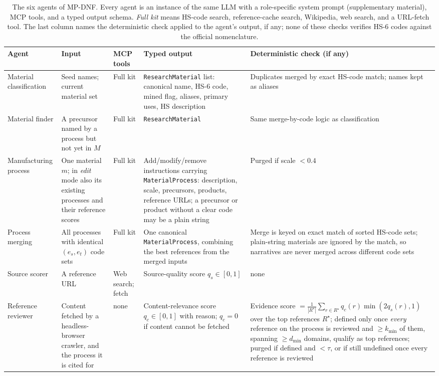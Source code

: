 \begin{table}[t]
\centering\footnotesize
\caption{The six agents of MP-DNF. Every agent is an instance of the same LLM with a role-specific system prompt (supplementary material), MCP tools, and a typed output schema. \emph{Full kit} means HS-code search, reference-cache search, Wikipedia, web search, and a URL-fetch tool. The last column names the deterministic check applied to the agent's output, if any; none of these checks verifies HS-6 codes against the official nomenclature.}
\label{tab:agents}
\begin{tabular}{>{\raggedright\arraybackslash}p{2.6cm}>{\raggedright\arraybackslash}p{3.6cm}>{\raggedright\arraybackslash}p{2.2cm}>{\raggedright\arraybackslash}p{3.8cm}>{\raggedright\arraybackslash}p{3.8cm}}
\toprule
Agent & Input & MCP tools & Typed output & Deterministic check (if any) \\
\midrule
Material classification & Seed names; current material set & Full kit & \texttt{ResearchMaterial} list: canonical name, HS-6 code, mined flag, aliases, primary uses, HS description & Duplicates merged by exact HS-code match; names kept as aliases \\
Material finder & A precursor named by a process but not yet in $M$ & Full kit & \texttt{ResearchMaterial} & Same merge-by-code logic as classification \\
Manufacturing process & One material $m$; in \emph{edit} mode also its existing processes and their reference scores & Full kit & Add/modify/remove instructions carrying \texttt{MaterialProcess}: description, scale, precursors, products, reference URLs; a precursor or product without a clear code may be a plain string & Purged if scale $<0.4$ \\
Process merging & All processes with identical $(e_s,e_t)$ code sets & Full kit & One canonical \texttt{MaterialProcess}, combining the best references from the merged inputs & Merge is keyed on exact match of sorted HS-code sets; plain-string materials are ignored by the match, so narratives are never merged across different code sets \\
Source scorer & A reference URL & Web search; fetch & Source-quality score $q_s\in[0,1]$ & none \\
Reference reviewer & Content fetched by a headless-browser crawler, and the process it is cited for & none & Content-relevance score $q_c\in[0,1]$ with reason; $q_c=0$ if content cannot be fetched & Evidence score $= \frac{1}{|R^\star|}\sum_{r\in R^\star} q_c(r)\min(2q_s(r),1)$ over the top references $R^\star$; defined only once \emph{every} reference on the process is reviewed and $\ge k_{\min}$ of them, spanning $\ge d_{\min}$ domains, qualify as top references; purged if defined and $<\tau$, or if still undefined once every reference is reviewed \\
\bottomrule
\end{tabular}
\end{table}

